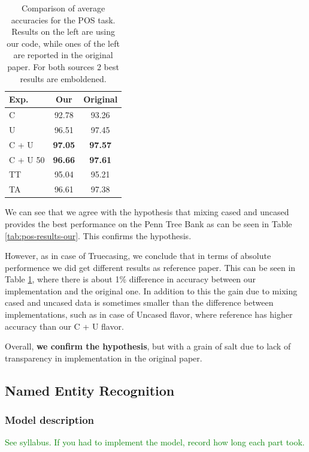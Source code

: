 \documentclass[11pt,a4paper]{article}
\begin{document}
    \begin{table}[h]
        \centering
        \begin{tabular}{|l|c|c|}
            \hline
            Exp. & Our & Original \\
            \hline
            C        & 92.78 & 93.26 \\
            U        & 96.51 & 97.45 \\
            C + U    & \textbf{97.05} & \textbf{97.57} \\
            C + U 50 & \textbf{96.66} & \textbf{97.61} \\
            TT       & 95.04 & 95.21 \\
            TA       & 96.61 & 97.38 \\
            \hline
        \end{tabular}
        \caption{Comparison of average accuracies for the POS task. Results on the left are using our code, while ones of the left are reported in the original paper. For both sources 2 best results are emboldened.}
        \label{tab:pos-results-comp}
    \end{table}

    We can see that we agree with the hypothesis that mixing cased and uncased provides the best performance on the Penn Tree Bank as can be seen in Table \ref{tab:pos-results-our}. This confirms the hypothesis.

    However, as in case of Truecasing, we conclude that in terms of absolute performence we did get different results as reference paper. This can be seen in Table \ref{tab:pos-results-comp}, where there is about 1\% difference in accuracy between our implementation and the original one. In addition to this the gain due to mixing cased and uncased data is sometimes smaller than the difference between implementations, such as in case of Uncased flavor, where reference has higher accuracy than our C + U flavor.

    Overall, \textbf{we confirm the hypothesis}, but with a grain of salt due to lack of transparency in implementation in the original paper.


\subsection{Named Entity Recognition}
\label{sec:exp-ner}

    \subsubsection{Model description}
    \textcolor{green}{See syllabus. If you had to implement the model, record how long each part took.}
\end{document}
